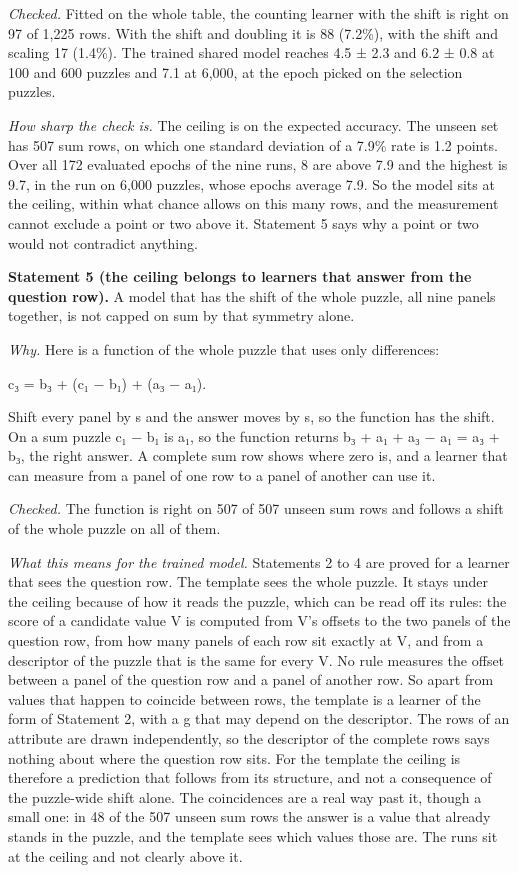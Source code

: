 \emph{Checked.} Fitted on the whole table, the counting learner with the shift is right on 97 of 1,225 rows. With the shift and doubling it is 88 (7.2\%), with the shift and scaling 17 (1.4\%). The trained shared model reaches 4.5 ± 2.3 and 6.2 ± 0.8 at 100 and 600 puzzles and 7.1 at 6,000, at the epoch picked on the selection puzzles.

\emph{How sharp the check is.} The ceiling is on the expected accuracy. The unseen set has 507 sum rows, on which one standard deviation of a 7.9\% rate is 1.2 points. Over all 172 evaluated epochs of the nine runs, 8 are above 7.9 and the highest is 9.7, in the run on 6,000 puzzles, whose epochs average 7.9. So the model sits at the ceiling, within what chance allows on this many rows, and the measurement cannot exclude a point or two above it. Statement 5 says why a point or two would not contradict anything.

\textbf{Statement 5 (the ceiling belongs to learners that answer from the question row).} A model that has the shift of the whole puzzle, all nine panels together, is not capped on sum by that symmetry alone.

\emph{Why.} Here is a function of the whole puzzle that uses only differences:

c₃ = b₃ + (c₁ − b₁) + (a₃ − a₁).

Shift every panel by s and the answer moves by s, so the function has the shift. On a sum puzzle c₁ − b₁ is a₁, so the function returns b₃ + a₁ + a₃ − a₁ = a₃ + b₃, the right answer. A complete sum row shows where zero is, and a learner that can measure from a panel of one row to a panel of another can use it.

\emph{Checked.} The function is right on 507 of 507 unseen sum rows and follows a shift of the whole puzzle on all of them.

\emph{What this means for the trained model.} Statements 2 to 4 are proved for a learner that sees the question row. The template sees the whole puzzle. It stays under the ceiling because of how it reads the puzzle, which can be read off its rules: the score of a candidate value V is computed from V's offsets to the two panels of the question row, from how many panels of each row sit exactly at V, and from a descriptor of the puzzle that is the same for every V. No rule measures the offset between a panel of the question row and a panel of another row. So apart from values that happen to coincide between rows, the template is a learner of the form of Statement 2, with a g that may depend on the descriptor. The rows of an attribute are drawn independently, so the descriptor of the complete rows says nothing about where the question row sits. For the template the ceiling is therefore a prediction that follows from its structure, and not a consequence of the puzzle-wide shift alone. The coincidences are a real way past it, though a small one: in 48 of the 507 unseen sum rows the answer is a value that already stands in the puzzle, and the template sees which values those are. The runs sit at the ceiling and not clearly above it.

